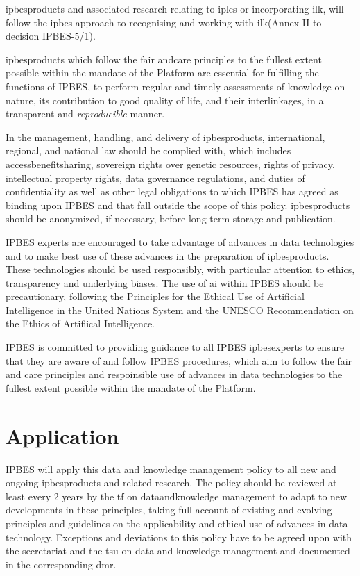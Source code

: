 \documentclass{article}
\begin{document}
\glspl{ipbesproduct} and associated \gls{research} relating to \glspl{iplc} or incorporating \gls{ilk}, will follow the \gls{ipbes} approach to recognising and working with \gls{ilk}(Annex II to decision IPBES-5/1).

\glspl{ipbesproduct} which follow the \gls{fair} and\gls{care} principles to the fullest extent possible within the mandate of the Platform are essential for fulfilling the functions of IPBES, to perform regular and timely assessments of \gls{knowledge} on nature, its contribution to good quality of life, and their interlinkages, in a transparent and \textit{reproducible} manner.

In the management, handling, and delivery of \glspl{ipbesproduct}, international, regional, and national law should be complied with, which includes \gls{accessbenefitsharing}, sovereign rights over genetic resources, rights of privacy, intellectual property rights, \gls{data} governance regulations, and duties of confidentiality as well as other legal obligations to which IPBES has agreed as binding upon IPBES and that fall outside the scope of this policy. \glspl{ipbesproduct} should be anonymized, if necessary, before long-term storage and publication.

IPBES experts are encouraged to take advantage of advances in \gls{data} technologies and to make best use of these advances in the preparation of \glspl{ipbesproduct}. These technologies should be used responsibly, with particular attention to ethics, transparency and underlying biases. The use of \gls{ai} within IPBES should be precautionary, following the Principles for the Ethical Use of Artificial Intelligence in the United Nations System and the UNESCO Recommendation on the Ethics of Artifiical Intelligence.

IPBES is committed to providing guidance to all IPBES \glspl{ipbesexpert} to ensure that they are aware of and follow IPBES procedures, which aim to follow the \gls{fair} and \gls{care} principles and respoinsible use of advances in \gls{data} technologies to the fullest extent possible within the mandate of the Platform.

\section{Application}

IPBES will apply this \gls{data} and \gls{knowledge} management policy to all new and ongoing \glspl{ipbesproduct} and related \gls{research}. The policy should be reviewed at least every 2 years by the \gls{tf} on \gls{dataandknowledge} management to adapt to new developments in these principles, taking full account of existing and evolving principles and guidelines on the applicability and ethical use of advances in \gls{data} technology. Exceptions and deviations to this policy have to be agreed upon with the \gls{secretariat} and the  \gls{tsu} on \gls{data} and \gls{knowledge} management and documented in the corresponding \gls{dmr}.
\end{document}
